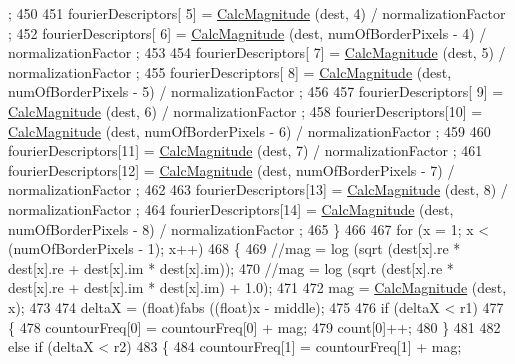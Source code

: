\begin{DoxyCode}
      ;
450 
451     fourierDescriptors[ 5] = \hyperlink{_contour_follower_8cpp_a439a52b08a2ee8bb055946b53bbeb2d3}{CalcMagnitude} (dest, 4)                     / normalizationFactor
      ;
452     fourierDescriptors[ 6] = \hyperlink{_contour_follower_8cpp_a439a52b08a2ee8bb055946b53bbeb2d3}{CalcMagnitude} (dest, numOfBorderPixels - 4) / normalizationFactor
      ;
453 
454     fourierDescriptors[ 7] = \hyperlink{_contour_follower_8cpp_a439a52b08a2ee8bb055946b53bbeb2d3}{CalcMagnitude} (dest, 5)                     / normalizationFactor
      ;
455     fourierDescriptors[ 8] = \hyperlink{_contour_follower_8cpp_a439a52b08a2ee8bb055946b53bbeb2d3}{CalcMagnitude} (dest, numOfBorderPixels - 5) / normalizationFactor
      ;
456 
457     fourierDescriptors[ 9] = \hyperlink{_contour_follower_8cpp_a439a52b08a2ee8bb055946b53bbeb2d3}{CalcMagnitude} (dest, 6)                     / normalizationFactor
      ;
458     fourierDescriptors[10] = \hyperlink{_contour_follower_8cpp_a439a52b08a2ee8bb055946b53bbeb2d3}{CalcMagnitude} (dest, numOfBorderPixels - 6) / normalizationFactor
      ;
459 
460     fourierDescriptors[11] = \hyperlink{_contour_follower_8cpp_a439a52b08a2ee8bb055946b53bbeb2d3}{CalcMagnitude} (dest, 7)                     / normalizationFactor
      ;
461     fourierDescriptors[12] = \hyperlink{_contour_follower_8cpp_a439a52b08a2ee8bb055946b53bbeb2d3}{CalcMagnitude} (dest, numOfBorderPixels - 7) / normalizationFactor
      ;
462 
463     fourierDescriptors[13] = \hyperlink{_contour_follower_8cpp_a439a52b08a2ee8bb055946b53bbeb2d3}{CalcMagnitude} (dest, 8)                     / normalizationFactor
      ;
464     fourierDescriptors[14] = \hyperlink{_contour_follower_8cpp_a439a52b08a2ee8bb055946b53bbeb2d3}{CalcMagnitude} (dest, numOfBorderPixels - 8) / normalizationFactor
      ;
465   \}
466 
467   \textcolor{keywordflow}{for}  (x = 1; x < (numOfBorderPixels - 1); x++)
468   \{
469     \textcolor{comment}{//mag = log (sqrt (dest[x].re * dest[x].re + dest[x].im * dest[x].im));}
470     \textcolor{comment}{//mag = log (sqrt (dest[x].re * dest[x].re + dest[x].im * dest[x].im) + 1.0);}
471  
472     mag = \hyperlink{_contour_follower_8cpp_a439a52b08a2ee8bb055946b53bbeb2d3}{CalcMagnitude} (dest, x);
473 
474     deltaX = (float)fabs ((\textcolor{keywordtype}{float})x - middle);
475 
476     \textcolor{keywordflow}{if}  (deltaX < r1)
477     \{
478       countourFreq[0] = countourFreq[0] + mag;
479       count[0]++;
480     \}
481 
482     \textcolor{keywordflow}{else} \textcolor{keywordflow}{if}  (deltaX < r2)
483     \{
484       countourFreq[1] = countourFreq[1] + mag;

\end{DoxyCode}
